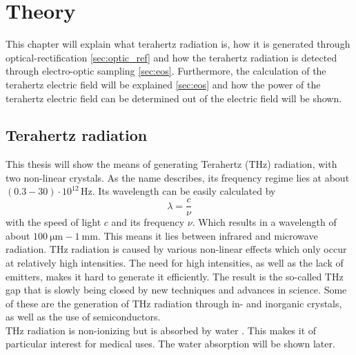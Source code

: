 \chapter{Theory}
This chapter will explain what terahertz radiation is, how it is generated through optical-rectification \ref{sec:optic_ref} and how the terahertz radiation is detected through electro-optic sampling \ref{sec:eos}.
Furthermore, the calculation of the terahertz electric field will be explained \ref{sec:eos} and how the power of the terahertz electric field can be determined out of the electric field will be shown.
\section{Terahertz radiation}
This thesis will show the means of generating Terahertz ($\si{\tera\hertz}$) radiation, with two non-linear crystals.
As the name describes, its frequency regime lies at about $(0.3-30)\cdot10^{12}\,\si{\hertz}$.
Its wavelength can be easily calculated by
\begin{equation}
    \lambda = \frac{c}{\nu}
\end{equation}
with the speed of light $c$ and its frequency $\nu$.
Which results in a wavelength of about $\SI{100}{\micro\meter}-\SI{1}{\milli\meter}$.
This means it lies between infrared and microwave radiation.
$\si{\tera\hertz}$ radiation is caused by various non-linear effects which only occur at relatively high intensities.
The need for high intensities, as well as the lack of emitters, makes it hard to generate it efficiently.
The result is the so-called $\si{\tera\hertz}$ gap that is slowly being closed by new techniques and advances in science.
Some of these are the generation of $\si{\tera\hertz}$ radiation through in- and inorganic crystals, as well as the use of semiconductors.
\\
$\si{\tera\hertz}$ radiation is non-ionizing but is absorbed by water \cite{water_absorption}.
This makes it of particular interest for medical uses.
The water absorption will be shown later. 


